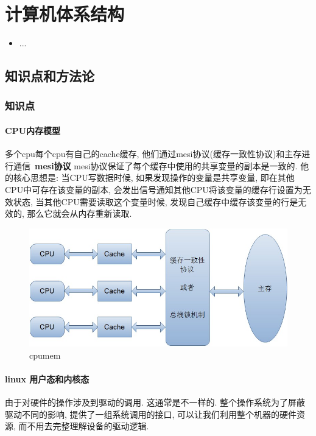 \chapter{计算机体系结构}
\label{chap1}
\begin{itemize}[noitemsep,topsep=0pt,parsep=0pt,partopsep=0pt]
	\item ...
\end{itemize}

\section{知识点和方法论}

\subsection{知识点}

\subsubsection{CPU内存模型}
多个cpu每个cpu有自己的cache缓存, 他们通过mesi协议(缓存一致性协议)和主存进行通信\
\textbf{mesi协议}
mesi协议保证了每个缓存中使用的共享变量的副本是一致的. 他的核心思想是: 当CPU写数据时候, 如果发现操作的变量是共享变量, 即在其他CPU中可存在该变量的副本, 会发出信号通知其他CPU将该变量的缓存行设置为无效状态, 当其他CPU需要读取这个变量时候, 发现自己缓存中缓存该变量的行是无效的, 那么它就会从内存重新读取.

\begin{figure}
	\centering
	\includegraphics[width=0.7\linewidth]{figures/cpumem.jpg}
	\caption{cpumem}
	\label{fig:cpumem}
\end{figure}



\subsubsection{linux 用户态和内核态}
由于对硬件的操作涉及到驱动的调用. 这通常是不一样的. 整个操作系统为了屏蔽驱动不同的影响, 提供了一组系统调用的接口, 可以让我们利用整个机器的硬件资源, 而不用去完整理解设备的驱动逻辑.

